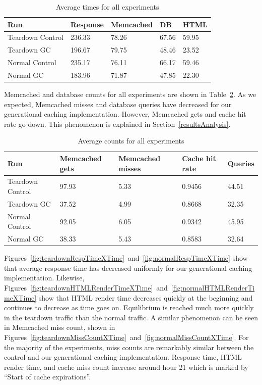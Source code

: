 \documentclass[12pt]{ucthesis}
\begin{document}
\begin{table}[h]
\begin{center}
\begin{tabular}{| l | l | l | l | l |}
   \hline
   Run & Response & Memcached & DB & HTML \\ \hline
   Teardown Control & 236.33 & 78.26 & 67.56 & 59.95 \\ \hline
   Teardown GC & 196.67 & 79.75 & 48.46 & 23.52 \\ \hline
   \hline
   Normal Control & 235.17 & 76.11 & 66.17 & 59.46 \\ \hline
   Normal GC & 183.96 & 71.87 & 47.85 & 22.30 \\
   \hline
\end{tabular}
\end{center}
\caption{Average times for all experiments}
\label{tab:averageExperimentTimes}
\end{table}

\textsf{Memcached} and database counts for all experiments are shown in Table~\ref{tab:averageExperimentCounts}.
As we expected, \textsf{Memcached} misses and database queries have decreased for our generational caching implementation.
However, \textsf{Memcached} gets and cache hit rate go down.
This phenomenon is explained in Section~\ref{resultsAnalysis}.

\begin{table}[h]
\begin{center}
\begin{tabular}{| l | l | p{2cm} | p{2cm} | l |}
   \hline
   Run & Memcached gets & Memcached misses & Cache hit rate & Queries \\ \hline
   Teardown Control & 97.93 & 5.33 & 0.9456 & 44.51 \\ \hline
   Teardown GC & 37.52 & 4.99 & 0.8668 & 32.35 \\ \hline
   \hline
   Normal Control & 92.05 & 6.05 & 0.9342 & 45.95 \\ \hline
   Normal GC & 38.33 & 5.43 & 0.8583 & 32.64 \\
   \hline
\end{tabular}
\end{center}
\caption{Average counts for all experiments}
\label{tab:averageExperimentCounts}
\end{table}

Figures~\ref{fig:teardownRespTimeXTime}~and~\ref{fig:normalRespTimeXTime} show that average response time has decreased uniformly for our generational caching implementation.
Likewise, Figures~\ref{fig:teardownHTMLRenderTimeXTime}~and~\ref{fig:normalHTMLRenderTimeXTime} show that HTML render time decreases quickly at the beginning and continues to decrease as time goes on.
Equilibrium is reached much more quickly in the teardown traffic than the normal traffic.
A similar phenomenon can be seen in \textsf{Memcached} miss count, shown in Figures~\ref{fig:teardownMissCountXTime}~and~\ref{fig:normalMissCountXTime}.
For the majority of the experiments, miss counts are remarkably similar between the control and our generational caching implementation.
Response time, HTML render time, and cache miss count increase around hour 21 which is marked by ``Start of cache expirations''.
\end{document}

